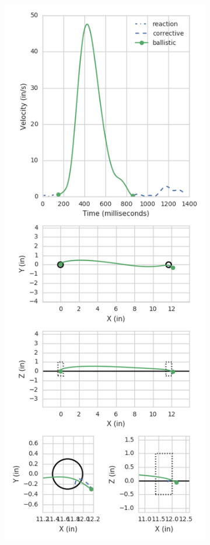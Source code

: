 \documentclass[]{aiaa-tc}%
\begin{document}
\begin{figure}[p]
  \centering
  \begin{subfigure}{.49\textwidth}
    \centering
    \includegraphics[width=.99\linewidth]{figures/mvmt6467.png}

\end{subfigure}
\end{figure}
\end{document}
